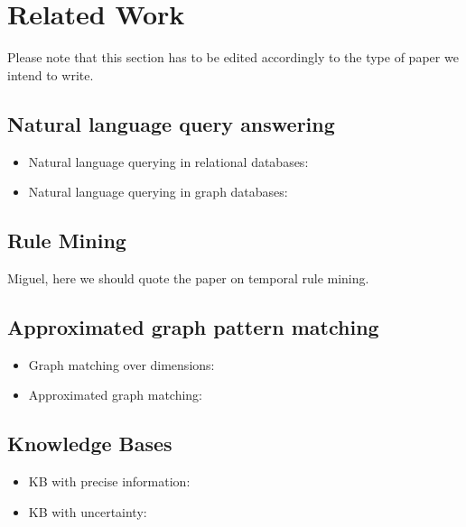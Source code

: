 \section{Related Work}
{\color{red} Please note that this section has to be edited accordingly to the type of paper we intend to write.}

\subsection{Natural language query answering}
\begin{itemize}
\item Natural language querying in relational databases: \cite{Li16,Saha16}
\item Natural language querying in graph databases: \cite{Hu0YWZ18}
\end{itemize}

\subsection{Rule Mining}
Miguel, here we should quote the paper on temporal rule mining.

\subsection{Approximated graph pattern matching}
\begin{itemize}
\item Graph matching over dimensions: \cite{PetermannMBPR17}
\item Approximated graph matching: \cite{DeVirgilio2015, ALIGON201520}
\end{itemize}

\subsection{Knowledge Bases}
\begin{itemize}
\item KB with precise information: \cite{ibmwatson}
\item KB with uncertainty: \cite{Chen14, Niu}
\end{itemize}
